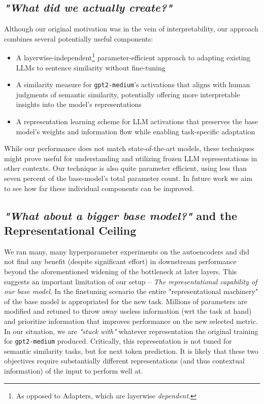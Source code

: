 \documentclass{article}
\begin{document}
\subsection{\textit{"What did we actually create?"}} \label{pathways}
Although our original motivation was in the vein of interpretability, our approach combines several potentially useful components:
\begin{itemize}
    \item A layerwise-independent\footnote{As opposed to Adapters, which are layerwise \textit{dependent}.} parameter-efficient approach to adapting existing LLMs to sentence similarity without fine-tuning
    \item A similarity measure for \verb|gpt2-medium|'s activations that aligns with human judgments of semantic similarity, potentially offering more interpretable insights into the model's representations
    \item A representation learning scheme for LLM activations that preserves the base model's weights and information flow while enabling task-specific adaptation
\end{itemize}
While our performance does not match state-of-the-art models, these techniques might prove useful for understanding and utilizing frozen LLM representations in other contexts. Our technique is also quite parameter efficient, using less than seven percent of the base-model's total parameter count. In future work we aim to see how far these individual components can be improved. 

\subsection{\textit{"What about a bigger base model?"} and the Representational Ceiling}
We ran many, many hyperparameter experiments on the autoencoders and did not find any benefit (despite significant effort) in downstream performance beyond the aforementioned widening of the bottleneck at later layers. This suggests an important limitation of our setup -- \textit{The representational capability of our base model}. In the finetuning scenario the entire "representational machinery" of the base model is appropriated for the new task. Millions of parameters are modified and retuned to throw away useless information (wrt the task at hand) and prioritize information that improves performance on the new selected metric. In our situation, we are \textit{"stuck with"} whatever representation the original training for \verb|gpt2-medium| produced. Critically, this representation is not tuned for semantic similarity tasks, but for next token prediction. It is likely that these two objectives require substantially different representations (and thus contextual information) of the input to perform well at.
\end{document}
